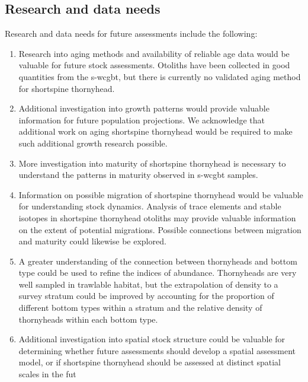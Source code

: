 \documentclass[11pt,
  english,
  letterpaper,
]{article}
\providecommand{\tightlist}{%
  \setlength{\itemsep}{0pt}\setlength{\parskip}{0pt}}
\providecommand{\tightlist}{%
  \setlength{\itemsep}{0pt}\setlength{\parskip}{0pt}}
\begin{document}
\hypertarget{research-and-data-needs}{%
\subsection*{Research and data needs}\label{research-and-data-needs}}

Research and data needs for future assessments include the following:

\begin{enumerate}
\def\labelenumi{\arabic{enumi}.}
\tightlist
\item
  Research into aging methods and availability of reliable age data would be valuable for future stock assessments. Otoliths have been collected in good quantities from the \gls{s-wcgbt}, but there is currently no validated aging method for shortspine thornyhead.
\item
  Additional investigation into growth patterns would provide valuable information for future population projections. We acknowledge that additional work on aging shortspine thornyhead would be required to make such additional growth research possible.
\item
  More investigation into maturity of shortspine thornyhead is necessary to understand the patterns in maturity observed in \gls{s-wcgbt} samples.
\item
  Information on possible migration of shortspine thornyhead would be valuable for understanding stock dynamics. Analysis of trace elements and stable isotopes in shortspine thornyhead otoliths may provide valuable information on the extent of potential migrations. Possible connections between migration and maturity could likewise be explored.
\item
  A greater understanding of the connection between thornyheads and bottom type could be used to refine the indices of abundance. Thornyheads are very well sampled in trawlable habitat, but the extrapolation of density to a survey stratum could be improved by accounting for the proportion of different bottom types within a stratum and the relative density of thornyheads within each bottom type.
\item
  Additional investigation into spatial stock structure could be valuable for determining whether future assessments should develop a spatial assessment model, or if shortspine thornyhead should be assessed at distinct spatial scales in the fut
\end{enumerate}
\end{document}
